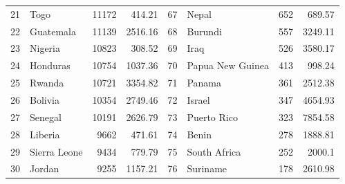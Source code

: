 \begin{longtable}{|c|l|r|r|c|l|r|r|}
	21          & Togo                  & 11172                              & 414.21                          & 67          & Nepal                 & 652                                & 689.57                          \\
	22          & Guatemala             & 11139                              & 2516.16                         & 68          & Burundi               & 557                                & 3249.11                         \\
	23          & Nigeria               & 10823                              & 308.52                          & 69          & Iraq                  & 526                                & 3580.17                         \\
	24          & Honduras              & 10754                              & 1037.36                         & 70          & Papua New Guinea      & 413                                & 998.24                          \\
	25          & Rwanda                & 10721                              & 3354.82                         & 71          & Panama                & 361                                & 2512.38                         \\
	26          & Bolivia               & 10354                              & 2749.46                         & 72          & Israel                & 347                                & 4654.93                         \\
	27          & Senegal               & 10191                              & 2626.79                         & 73          & Puerto Rico           & 323                                & 7854.58                         \\
	28          & Liberia               & 9662                               & 471.61                          & 74          & Benin                 & 278                                & 1888.81                         \\
	29          & Sierra Leone          & 9434                               & 779.79                          & 75          & South Africa          & 252                                & 2000.1                          \\
	30          & Jordan                & 9255                               & 1157.21                         & 76          & Suriname              & 178                                & 2610.98                         \\

\end{longtable}
